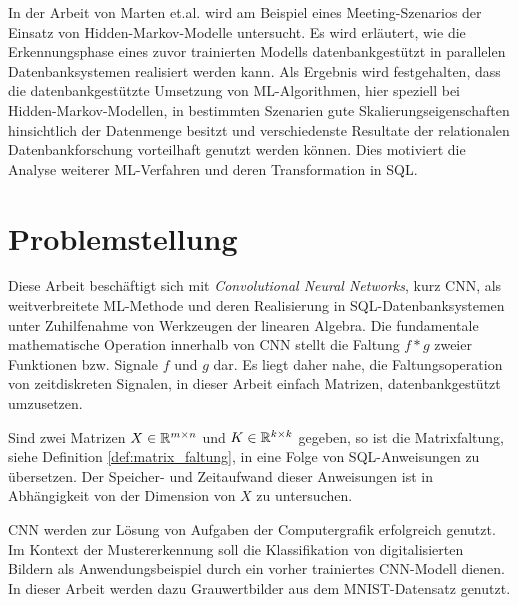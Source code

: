In der Arbeit von Marten et.al. \cite{marten2017machine} wird am Beispiel eines Meeting-Szenarios der Einsatz von Hidden-Markov-Modelle untersucht. Es wird erläutert, wie die Erkennungsphase eines zuvor trainierten Modells datenbankgestützt in parallelen Datenbanksystemen realisiert werden kann.   
Als Ergebnis wird festgehalten, dass die datenbankgestützte Umsetzung von ML-Algorithmen, hier speziell bei Hidden-Markov-Modellen, in bestimmten Szenarien gute Skalierungseigenschaften hinsichtlich der Datenmenge besitzt und verschiedenste Resultate der relationalen Datenbankforschung vorteilhaft genutzt werden können. Dies motiviert die Analyse weiterer ML-Verfahren und deren Transformation in SQL. 

\section*{Problemstellung}
\label{abs:problemstellung}
Diese Arbeit beschäftigt sich mit \textit{Convolutional Neural Networks}, kurz CNN, als weitverbreitete ML-Methode und deren Realisierung in SQL-Datenbanksystemen unter Zuhilfenahme von Werkzeugen der linearen Algebra. Die fundamentale mathematische Operation innerhalb von CNN stellt die Faltung $ f \ast g$ zweier Funktionen bzw. Signale $f$ und $g$ dar. 
Es liegt daher nahe, die Faltungsoperation von zeitdiskreten Signalen, in dieser Arbeit einfach Matrizen, datenbankgestützt umzusetzen.

\begin{problem}
    \label{prob:conv_in_sql}
Sind zwei Matrizen $X \in \mathbb{R}^{m \times n}$ und $K \in \mathbb{R}^{k \times k}$ gegeben, so ist die Matrixfaltung, siehe Definition \ref{def:matrix_faltung}, in eine Folge von SQL-Anweisungen zu übersetzen. Der Speicher- und Zeitaufwand dieser Anweisungen ist in Abhängigkeit von der Dimension von $X$ zu untersuchen.   
\end{problem}

CNN werden zur Lösung von Aufgaben der Computergrafik \cite{DBLP:conf/nips/KrizhevskySH12, DBLP:journals/pieee/LeCunBBH98,DBLP:conf/cvpr/CiresanMS12} erfolgreich genutzt.
Im Kontext der Mustererkennung soll die Klassifikation von digitalisierten Bildern als Anwendungsbeispiel durch ein vorher trainiertes CNN-Modell dienen. In dieser Arbeit werden dazu Grauwertbilder aus dem MNIST-Datensatz \cite{DBLP:journals/pieee/LeCunBBH98} genutzt. 

